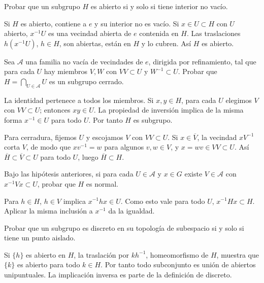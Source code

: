 \begin{ejercicio}\label{ej:v4-l16-1}
Probar que un subgrupo $H$ es abierto si y solo si tiene interior no vacío.
\end{ejercicio}
\begin{solucion}
Si $H$ es abierto, contiene a $e$ y su interior no es vacío. Si $x\in U\subset H$ con $U$ abierto, $x^{-1}U$ es una vecindad abierta de $e$ contenida en $H$. Las traslaciones $h(x^{-1}U)$, $h\in H$, son abiertas, están en $H$ y lo cubren. Así $H$ es abierto.
\end{solucion}

\begin{ejercicio}\label{ej:v4-l16-2}
Sea $\mathcal A$ una familia no vacía de vecindades de $e$, dirigida por refinamiento, tal que para cada $U$ hay miembros $V,W$ con $VV\subset U$ y $W^{-1}\subset U$. Probar que $H=\bigcap_{U\in\mathcal A}U$ es un subgrupo cerrado.
\end{ejercicio}
\begin{solucion}
La identidad pertenece a todos los miembros. Si $x,y\in H$, para cada $U$ elegimos $V$ con $VV\subset U$; entonces $xy\in U$. La propiedad de inversión implica de la misma forma $x^{-1}\in U$ para todo $U$. Por tanto $H$ es subgrupo.

Para cerradura, fijemos $U$ y escojamos $V$ con $VV\subset U$. Si $x\in\overline V$, la vecindad $xV^{-1}$ corta $V$, de modo que $xv^{-1}=w$ para algunos $v,w\in V$, y $x=wv\in VV\subset U$. Así $\overline H\subset\overline V\subset U$ para todo $U$, luego $\overline H\subset H$.
\end{solucion}

\begin{ejercicio}\label{ej:v4-l16-3}
Bajo las hipótesis anteriores, si para cada $U\in\mathcal A$ y $x\in G$ existe $V\in\mathcal A$ con $x^{-1}Vx\subset U$, probar que $H$ es normal.
\end{ejercicio}
\begin{solucion}
Para $h\in H$, $h\in V$ implica $x^{-1}hx\in U$. Como esto vale para todo $U$, $x^{-1}Hx\subset H$. Aplicar la misma inclusión a $x^{-1}$ da la igualdad.
\end{solucion}

\begin{ejercicio}\label{ej:v4-l16-4}
Probar que un subgrupo es discreto en su topología de subespacio si y solo si tiene un punto aislado.
\end{ejercicio}
\begin{solucion}
Si $\{h\}$ es abierto en $H$, la traslación por $kh^{-1}$, homeomorfismo de $H$, muestra que $\{k\}$ es abierto para todo $k\in H$. Por tanto todo subconjunto es unión de abiertos unipuntuales. La implicación inversa es parte de la definición de discreto.
\end{solucion}

